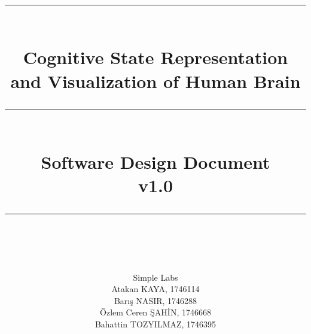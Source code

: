 
\newcommand{\horrule}[1]{\rule{\linewidth}{#1}} 	%

\title{
		\vspace{1in} 	
		\horrule{0.5pt} \\[0.4cm]
		\huge Cognitive State Representation and Visualization of Human Brain \\
		\horrule{2pt} \\[0.5cm]
		\Large Software Design Document \\
		\normalfont \normalsize v1.0 \\
		\horrule{0.5pt} \\[0.4cm]
}
\author{
		\normalfont 
		\Large \textsf{Simple Labs}\\[0.5cm] \normalsize
        \hfill Atakan KAYA, 1746114 \\[-3pt]		\normalsize
        \hfill Barış NASIR, 1746288 \\[-3pt]		\normalsize
        \hfill Özlem Ceren ŞAHİN, 1746668 \\[-3pt]		\normalsize
        \hfill Bahattin TOZYILMAZ, 1746395 \\[-3pt]		\normalsize        
}
\date{}